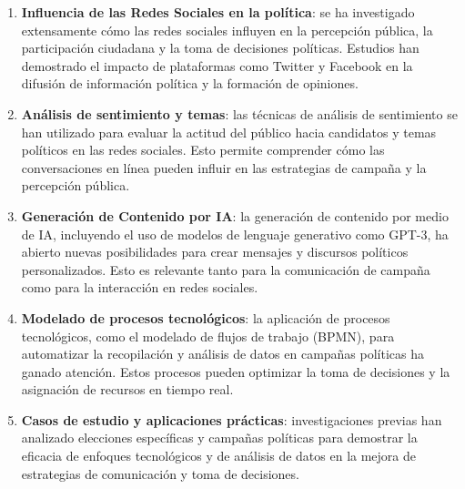 \documentclass[12pt]{article}
\begin{document}
\begin{enumerate}
\item \textbf{Influencia de las Redes Sociales en la política}: se ha investigado extensamente cómo las redes sociales influyen en la percepción pública, la participación ciudadana y la toma de decisiones políticas. Estudios han demostrado el impacto de plataformas como Twitter y Facebook en la difusión de información política y la formación de opiniones.

\item \textbf{Análisis de sentimiento y temas}: las técnicas de análisis de sentimiento se han utilizado para evaluar la actitud del público hacia candidatos y temas políticos en las redes sociales. Esto permite comprender cómo las conversaciones en línea pueden influir en las estrategias de campaña y la percepción pública.

\item \textbf{Generación de Contenido por IA}: la generación de contenido por medio de IA, incluyendo el uso de modelos de lenguaje generativo como GPT-3, ha abierto nuevas posibilidades para crear mensajes y discursos políticos personalizados. Esto es relevante tanto para la comunicación de campaña como para la interacción en redes sociales.

\item \textbf{Modelado de procesos tecnológicos}: la aplicación de procesos tecnológicos, como el modelado de flujos de trabajo (BPMN), para automatizar la recopilación y análisis de datos en campañas políticas ha ganado atención. Estos procesos pueden optimizar la toma de decisiones y la asignación de recursos en tiempo real.

\item \textbf{Casos de estudio y aplicaciones prácticas}: investigaciones previas han analizado elecciones específicas y campañas políticas para demostrar la eficacia de enfoques tecnológicos y de análisis de datos en la mejora de estrategias de comunicación y toma de decisiones.
\end{enumerate}

\end{document}
